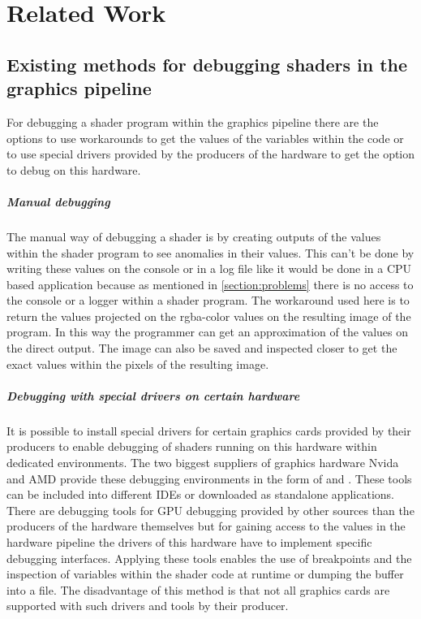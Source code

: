 
\chapter{Related Work}\label{cha:RelatedWork}
\section{Existing methods for debugging shaders in the graphics pipeline}
\label{section:debuggingMethods}

For debugging a shader program within the graphics pipeline there are the options to use workarounds to get the values of the variables within the code or to use special drivers provided by the producers of the hardware to get the option to debug on this hardware.

\paragraph{Manual debugging}

The manual way of debugging a shader is by creating outputs of the values within the shader program to see anomalies in their values. This can't be done by writing these values on the console or in a log file like it would be done in a CPU based application because as mentioned in \autoref{section:problems} there is no access to the console or a logger within a shader program. The workaround used here is to return the values projected on the rgba-color values on the resulting image of the program. In this way the programmer can get an approximation of the values on the direct output. The image can also be saved and inspected closer to get the exact values within the pixels of the resulting image.

\paragraph{Debugging with special drivers on certain hardware}
\label{section:debuggingMethods_drivers}

It is possible to install special drivers for certain graphics cards provided by their producers to enable debugging of shaders running on this hardware within dedicated environments. The two biggest suppliers of graphics hardware Nvida and AMD provide these debugging environments in the form of \cite{Nvidia_Nsight} and \cite{AMD_GPUPerfStudio}. These tools can be included into different IDEs or downloaded as standalone applications. There are debugging tools for GPU debugging provided by other sources than the producers of the hardware themselves but for gaining access to the values in the hardware pipeline the drivers of this hardware have to implement specific debugging interfaces. Applying these tools enables the use of breakpoints and the inspection of variables within the shader code at runtime or dumping the buffer into a file. The disadvantage of this method is that not all graphics cards are supported with such drivers and tools by their producer.

